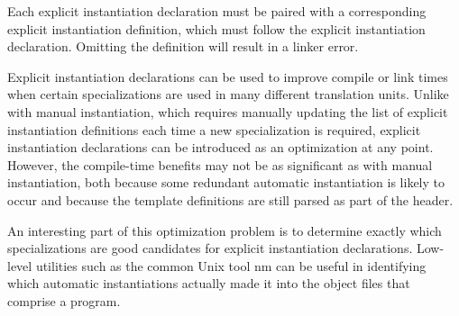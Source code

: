 Each explicit instantiation declaration must be paired with a corresponding explicit instantiation definition, which must follow the explicit instantiation declaration. Omitting the definition will result in a linker error.

Explicit instantiation declarations can be used to improve compile or link times when certain specializations are used in many different translation units. Unlike with manual instantiation, which requires manually updating the list of explicit instantiation definitions each time a new specialization is required, explicit instantiation declarations can be introduced as an optimization at any point. However, the compile-time benefits may not be as significant as with manual instantiation, both because some redundant automatic instantiation is likely to occur and because the template definitions are still parsed as part of the header.

\begin{tcolorbox}[colback=webgreen!5!white,colframe=webgreen!75!black]
\hspace*{0.75cm} An interesting part of this optimization problem is to determine exactly which specializations are good candidates for explicit instantiation declarations. Low-level utilities such as the common Unix tool nm can be useful in identifying which automatic instantiations actually made it into the object files that comprise a program.
\end{tcolorbox}

















